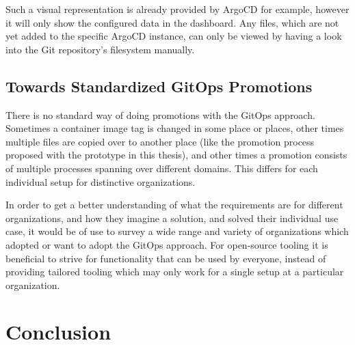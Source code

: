Such a visual representation is already provided by ArgoCD for example,
however it will only show the configured data in the dashboard.
Any files, which are not yet added to the specific ArgoCD instance,
can only be viewed by having a look into the Git repository's filesystem manually.




\section*{Towards Standardized GitOps Promotions}

There is no standard way of doing promotions with the GitOps approach.
Sometimes a container image tag is changed in some place or places,
other times multiple files are copied over to another place (like the promotion process proposed with the prototype in this thesis),
and other times a promotion consists of multiple processes spanning over different domains.
This differs for each individual setup for distinctive organizations.

In order to get a better understanding of what the requirements are for different organizations,
and how they imagine a solution, and solved their individual use case,
it would be of use to survey a wide range and variety of organizations which adopted or want to adopt the GitOps approach.
For open-source tooling it is beneficial to strive for functionality that can be used by everyone,
instead of providing tailored tooling which may only work for a single setup at a particular organization.

















\chapter{Conclusion}
\label{conclusion}

%
%
%
%


